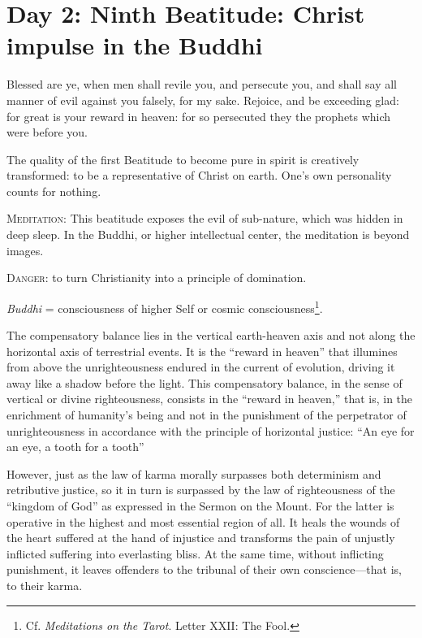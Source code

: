 \section{Day 2: Ninth Beatitude: Christ impulse in the Buddhi}

\begin{quotex}
Blessed are ye, when men shall revile you, and persecute you, and shall say all manner of evil against you falsely, for my sake. Rejoice, and be exceeding glad: for great is your reward in heaven: for so persecuted they the prophets which were before you. 
\end{quotex}

The quality of the first Beatitude to become pure in spirit is creatively transformed: to be a representative of Christ on earth. One's own personality counts for nothing.

\textsc{Meditation}: This beatitude exposes the evil of sub-nature, which was hidden in deep sleep. In the Buddhi, or higher intellectual center, the meditation is beyond images.

\textsc{Danger}: to turn Christianity into a principle of domination.

\emph{Buddhi} = consciousness of higher Self or cosmic consciousness\footnote{Cf. \emph{Meditations on the Tarot}. Letter XXII: The Fool.}.

The compensatory balance lies in the vertical earth-heaven axis and not along the horizontal axis of terrestrial events. It is the ``reward in heaven'' that illumines from above the unrighteousness endured in the current of evolution, driving it away like a shadow before the light. This compensatory balance, in the sense of vertical or divine righteousness, consists in the ``reward in heaven,'' that is, in the enrichment of humanity's being and not in the punishment of the perpetrator of unrighteousness in accordance with the principle of horizontal justice: ``An eye for an eye, a tooth for a tooth''

\begin{quotex}
However, just as the law of karma morally surpasses both determinism and retributive justice, so it in turn is surpassed by the law of righteousness of the ``kingdom of God'' as expressed in the Sermon on the Mount. For the latter is operative in the highest and most essential region of all. It heals the wounds of the heart suffered at the hand of injustice and transforms the pain of unjustly inflicted suffering into everlasting bliss. At the same time, without inflicting punishment, it leaves offenders to the tribunal of their own conscience—that is, to their karma. 

\end{quotex}

